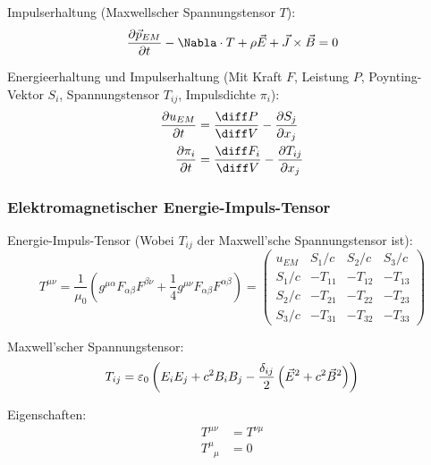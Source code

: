 \documentclass[11pt]{article}
\numberwithin{equation}{section}
\begin{document}
				\noindent
				Impulserhaltung (Maxwellscher Spannungstensor $T$):
				\begin{equation}
					\pder{\vec{p}_{EM}}{t} - \Nabla\cdot T + \rho \vec{E} + \vec{J}\times\vec{B} = 0
				\end{equation}

				\noindent
				Energieerhaltung und Impulserhaltung (Mit Kraft $F$, Leistung $P$, Poynting-Vektor $S_i$, Spannungstensor $T_{ij}$, Impulsdichte $\pi_i$):
				\begin{equation}
					\begin{aligned}
						\pder{u_{EM}}{t} &= \tder{P}{V} - \pder{S_j}{x_j} \\
						\pder{\pi_i}{t} &=	\tder{F_i}{V} - \pder{T_{ij}}{x_j}
					\end{aligned}
				\end{equation}

			\subsubsection{Elektromagnetischer Energie-Impuls-Tensor}
				\noindent
				Energie-Impuls-Tensor (Wobei $T_{ij}$ der Maxwell'sche Spannungstensor ist):
				\begin{equation}
					T^{\mu\nu} = \frac{1}{\mu_0}\left(g^{\mu\alpha} F_{\alpha\beta} F^{\beta\nu} +\frac{1}{4}g^{\mu\nu} F_{\alpha\beta} F^{\alpha\beta} \right)
					= \left( \begin{matrix}
						u_{EM} & S_1/c & S_2/c & S_3/c \\
						S_1/c & -T_{11} & -T_{12} & -T_{13} \\
						S_2/c	& -T_{21} & -T_{22} & -T_{23} \\
						S_3/c & -T_{31} & -T_{32} & -T_{33}
					\end{matrix} \right)
				\end{equation}

				\noindent
				Maxwell'scher Spannungstensor:
				\begin{equation}
					T_{ij} = \varepsilon_0 \left(  E_i E_j + c^2 B_i B_j - \frac{\delta_{ij}}{2}\left(  \vec{E}^2 + c^2 \vec{B}^2  \right)  \right)
				\end{equation}

				\noindent
				Eigenschaften:
				\begin{equation}
					\begin{aligned}
						T^{\mu\nu} &= T^{\nu\mu} \\
						T^\mu_{\phantom{\mu}\mu} &= 0 \\
					\end{aligned}
				\end{equation}
\end{document}
